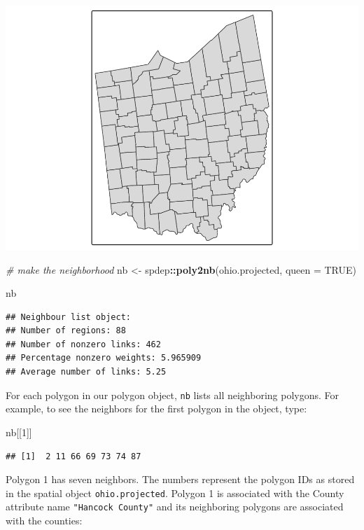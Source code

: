 \documentclass[]{article}
\newenvironment{Shaded}{\begin{snugshade}}{\end{snugshade}}
\newcommand{\AttributeTok}[1]{\textcolor[rgb]{0.13,0.29,0.53}{#1}}
\newcommand{\CommentTok}[1]{\textcolor[rgb]{0.56,0.35,0.01}{\textit{#1}}}
\newcommand{\ConstantTok}[1]{\textcolor[rgb]{0.56,0.35,0.01}{#1}}
\newcommand{\DecValTok}[1]{\textcolor[rgb]{0.00,0.00,0.81}{#1}}
\newcommand{\FunctionTok}[1]{\textcolor[rgb]{0.13,0.29,0.53}{\textbf{#1}}}
\newcommand{\NormalTok}[1]{#1}
\newcommand{\OtherTok}[1]{\textcolor[rgb]{0.56,0.35,0.01}{#1}}
\newcommand{\SpecialCharTok}[1]{\textcolor[rgb]{0.81,0.36,0.00}{\textbf{#1}}}
\begin{document}
\includegraphics{lab03_files/figure-latex/make some neighbors-1.pdf}

\begin{Shaded}
\begin{Highlighting}[]
\CommentTok{\# make the neighborhood}
\NormalTok{nb }\OtherTok{\textless{}{-}}\NormalTok{ spdep}\SpecialCharTok{::}\FunctionTok{poly2nb}\NormalTok{(ohio.projected, }\AttributeTok{queen =} \ConstantTok{TRUE}\NormalTok{)}

\NormalTok{nb}
\end{Highlighting}
\end{Shaded}

\begin{verbatim}
## Neighbour list object:
## Number of regions: 88 
## Number of nonzero links: 462 
## Percentage nonzero weights: 5.965909 
## Average number of links: 5.25
\end{verbatim}

For each polygon in our polygon object, \texttt{nb} lists all
neighboring polygons. For example, to see the neighbors for the first
polygon in the object, type:

\begin{Shaded}
\begin{Highlighting}[]
\NormalTok{nb[[}\DecValTok{1}\NormalTok{]]}
\end{Highlighting}
\end{Shaded}

\begin{verbatim}
## [1]  2 11 66 69 73 74 87
\end{verbatim}

Polygon 1 has seven neighbors. The numbers represent the polygon IDs as
stored in the spatial object \texttt{ohio.projected}. Polygon 1 is
associated with the County attribute name \texttt{"Hancock\ County"} and
its neighboring polygons are associated with the counties:
\end{document}
